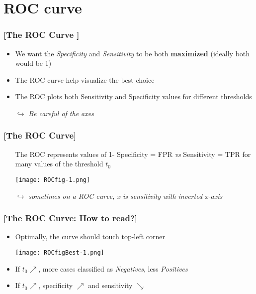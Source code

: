 \documentclass[xcolor=x11names,compress, aspectratio=169]{beamer}
\renewcommand{\(}{\begin{columns}}
\renewcommand{\)}{\end{columns}}
\newcommand{\<}[1]{\begin{column}{#1}}
\renewcommand{\>}{\end{column}}
\begin{document}
\section{ROC curve}

\begin{frame} %
\frametitle{\textcolor{brique}{[The ROC Curve ]}}
\pause
 \begin{itemize}[<+->]
  \item We want the \textit{Specificity} and \textit{Sensitivity} to be both \textbf{maximized} (ideally both would be 1)
  \item The ROC curve help visualize the best choice
  \item The ROC plots both Sensitivity and Specificity values for different thresholds
  \item[$\hookrightarrow$] \textit{Be careful of the axes }
\end{itemize}
\end{frame}


\begin{frame} %
\frametitle{\textcolor{brique}{[The ROC Curve]}}
\pause
 \begin{itemize}[<+->]
  \item[] The ROC represents values of 1- Specificity =  FPR  \textit{vs} Sensitivity =  TPR for many values of the threshold $t_0$
  \item[] \begin{center}\texttt{[image: ROCfig-1.png]} \end{center}
  \item[$\hookrightarrow$]  \textit{sometimes  on a ROC curve, x is sensitivity  with inverted x-axis}
\end{itemize}
\end{frame}

\begin{frame} %
\frametitle{\textcolor{brique}{[The ROC Curve: How to read?]}}
\pause
 \begin{itemize}[<+->]
  \item[] %
  \item  Optimally, the curve should touch top-left corner
  \item[] \begin{center}\texttt{[image: ROCfigBest-1.png]} \end{center}
  \item If $t_0  \nearrow $,  more cases  classified as \textit{Negatives}, less \textit{Positives}
  \item If $t_0  \nearrow $,   specificity  $\nearrow $ and sensitivity $\searrow$
\end{itemize}
\end{frame}
\end{document}
